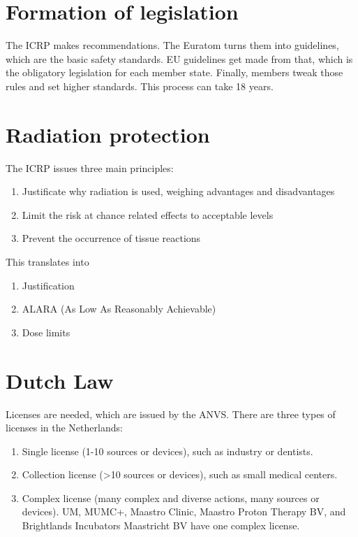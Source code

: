 \section{Formation of legislation}
The ICRP makes recommendations. The Euratom turns them into guidelines, which are the basic safety standards. EU guidelines get made from that, which is the obligatory legislation for each member state. Finally, members tweak those rules and set higher standards. This process can take 18 years.

\section{Radiation protection}
The ICRP issues three main principles:
\begin{enumerate}
	\item Justificate why radiation is used, weighing advantages and disadvantages
	\item Limit the risk at chance related effects to acceptable levels	
	\item Prevent the occurrence of tissue reactions
\end{enumerate}
This translates into
\begin{enumerate}
	\item Justification
	\item ALARA (As Low As Reasonably Achievable)
	 \item Dose limits
\end{enumerate}

\section{Dutch Law}
Licenses are needed, which are issued by the ANVS. There are three types of licenses in the Netherlands:
\begin{enumerate}
	\item Single license (1-10 sources or devices), such as industry or dentists.
	\item Collection license (>10 sources or devices), such as small medical centers.
	\item Complex license (many complex and diverse actions, many sources or devices). UM, MUMC+, Maastro Clinic, Maastro Proton Therapy BV, and Brightlands Incubators Maastricht BV have one complex license.
\end{enumerate}


